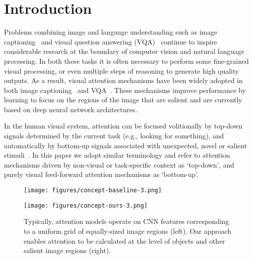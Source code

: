 \documentclass[10pt,twocolumn,letterpaper]{article}
\begin{document}
\section{Introduction}

Problems combining image and language understanding such as image captioning~\cite{Chen2015} and visual question answering (VQA)~\cite{balanced_vqa_v2} continue to inspire considerable research at the boundary of computer vision and natural language processing. In both these tasks it is often necessary to perform some fine-grained visual processing, or even multiple steps of reasoning to generate high quality outputs. As a result, visual attention mechanisms have been widely adopted in both image captioning~\cite{scst2016,sentinel,reviewnet,Xu2015} and VQA~\cite{fukui2016multimodal,coatt,askattend,stacked,visual7w}. These mechanisms improve performance by learning to focus on the regions of the image that are salient and are currently based on deep neural network architectures.

In the human visual system, attention can be focused volitionally by top-down signals determined by the current task (e.g., looking for something), and automatically by bottom-up signals associated with unexpected, novel or salient stimuli~\cite{buschman2007top,corbetta2002control}. In this paper we adopt similar terminology and refer to attention mechanisms driven by non-visual or task-specific context as `top-down', and purely visual feed-forward attention mechanisms as `bottom-up'.

\begin{figure}[t]
	\begin{minipage}{.5\linewidth}
		\begin{center}
			\texttt{[image: figures/concept-baseline-3.png]}
		\end{center}
	\end{minipage}\begin{minipage}{.5\linewidth}
		\begin{center}
			\texttt{[image: figures/concept-ours-3.png]}
		\end{center}
	\end{minipage}\caption{Typically, attention models operate on CNN features corresponding to a uniform grid of equally-sized image regions (left). Our approach enables attention to be calculated at the level of objects and other salient image regions (right).}
	\label{fig:concept}
\end{figure}
\end{document}

